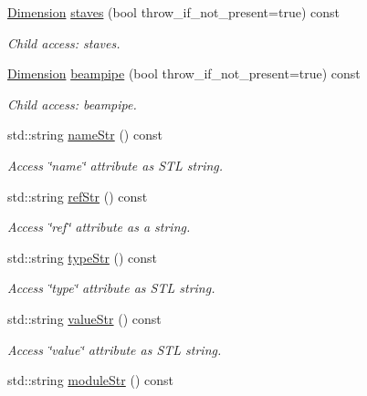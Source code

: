 \begin{DoxyCompactItemize}
\hyperlink{struct_d_d4hep_1_1_x_m_l_1_1_dimension}{Dimension} \hyperlink{struct_d_d4hep_1_1_x_m_l_1_1_dimension_ad283054d5d690865227f202982aa46a7}{staves} (bool throw\+\_\+if\+\_\+not\+\_\+present=true) const
\begin{DoxyCompactList}\small\item\em Child access\+: staves. \end{DoxyCompactList}\item 
\hyperlink{struct_d_d4hep_1_1_x_m_l_1_1_dimension}{Dimension} \hyperlink{struct_d_d4hep_1_1_x_m_l_1_1_dimension_a79feab35d6321d0c003b6f170d4710c8}{beampipe} (bool throw\+\_\+if\+\_\+not\+\_\+present=true) const
\begin{DoxyCompactList}\small\item\em Child access\+: beampipe. \end{DoxyCompactList}\item 
std\+::string \hyperlink{struct_d_d4hep_1_1_x_m_l_1_1_dimension_a58e9198fb6bdb6099a8035ea2343f395}{name\+Str} () const
\begin{DoxyCompactList}\small\item\em Access \char`\"{}name\char`\"{} attribute as S\+TL string. \end{DoxyCompactList}\item 
std\+::string \hyperlink{struct_d_d4hep_1_1_x_m_l_1_1_dimension_af5a76fd13bfe67a92860726785d30ef7}{ref\+Str} () const
\begin{DoxyCompactList}\small\item\em Access \char`\"{}ref\char`\"{} attribute as a string. \end{DoxyCompactList}\item 
std\+::string \hyperlink{struct_d_d4hep_1_1_x_m_l_1_1_dimension_a9cd1d001087fa8da92ff5c8240873133}{type\+Str} () const
\begin{DoxyCompactList}\small\item\em Access \char`\"{}type\char`\"{} attribute as S\+TL string. \end{DoxyCompactList}\item 
std\+::string \hyperlink{struct_d_d4hep_1_1_x_m_l_1_1_dimension_a0294b54367d4bb0ce8d72a6496e5ae33}{value\+Str} () const
\begin{DoxyCompactList}\small\item\em Access \char`\"{}value\char`\"{} attribute as S\+TL string. \end{DoxyCompactList}\item 
std\+::string \hyperlink{struct_d_d4hep_1_1_x_m_l_1_1_dimension_ab305c3d384b6227b414e5cb8cd0d061a}{module\+Str} () const

\end{DoxyCompactItemize}
